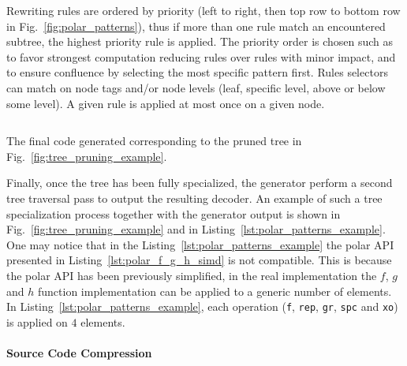 Rewriting rules are ordered by priority (left to right, then top row to bottom
row in Fig.~\ref{fig:polar_patterns}), thus if more than one rule match an
encountered subtree, the highest priority rule is applied. The priority order is
chosen such as to favor strongest computation reducing rules over rules with
minor impact, and to ensure confluence by selecting the most specific pattern
first. Rules selectors can match on node tags and/or node levels (leaf, specific
level, above or below some level). A given rule is applied at most once on a
given node.

\begin{listing}[htp]
  \inputminted[frame=lines,linenos]{C++}{main/chapter3/src/polar/generated_sc_decoder.cpp}
  \caption{The final code generated corresponding to the pruned tree in
    Fig.~\ref{fig:tree_pruning_example}.}
  \label{lst:polar_patterns_example}
\end{listing}

Finally, once the tree has been fully specialized, the generator perform a
second tree traversal pass to output the resulting decoder. An example of such a
tree specialization process together with the generator output is shown in
Fig.~\ref{fig:tree_pruning_example} and in
Listing~\ref{lst:polar_patterns_example}. One may notice that in the
Listing~\ref{lst:polar_patterns_example} the polar API presented in
Listing~\ref{lst:polar_f_g_h_simd} is not compatible. This is because the polar
API has been previously simplified, in the real implementation the $f$, $g$ and
$h$ function implementation can be applied to a generic number of elements. In
Listing~\ref{lst:polar_patterns_example}, each operation (\verb|f|, \verb|rep|,
\verb|gr|, \verb|spc| and \verb|xo|) is applied on $4$ elements.

\paragraph{Source Code Compression}

